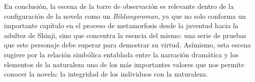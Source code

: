 En conclusión, la escena de la torre de observación es relevante dentro de la configuración de la novela como un \emph{Bildungsroman}, ya que no solo conforma un importante capítulo en el proceso de metamorfosis desde la juventud hacia la adultez de Shinji, sino que concentra la esencia del mismo: una serie de pruebas que este personaje debe superar para demostrar su virtud. Asímismo, esta escena sugiere por la relación simbólica entablada  entre la narración dramática y los elementos de la naturaleza uno de los más importantes valores que nos permite conocer la novela: la integridad de los individuos con la naturaleza. 
